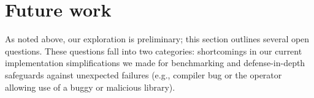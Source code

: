 \section{Future work}
\label{sec:future}

As noted above, our exploration is preliminary; this section outlines several
open questions.  These questions fall into two categories:\@
\ifdefined\mk
shortcomings in our current implementation
\else
simplifications we made for benchmarking
\fi
and defense-in-depth safeguards against unexpected
failures (e.g., compiler bug or the operator allowing use of a buggy or malicious library).
